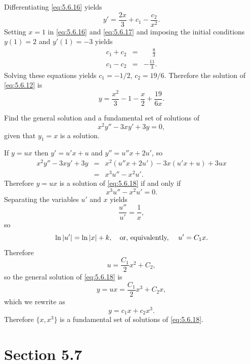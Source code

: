 \begin{examplesolution}
 Differentiating \eqref{eq:5.6.16} yields
\begin{equation}
  \label{eq:5.6.17}y'=\frac{2x}{3}+c_{1}-\frac{c_{2}}{x^{2}}.
\end{equation}
Setting $x=1$ in \eqref{eq:5.6.16} and \eqref{eq:5.6.17} and imposing the initial conditions
$y(1)=2$ and $y'(1)=-3$ yields
\begin{eqnarray*}
  c_{1}+c_{2} & = & \phantom{-}{\frac{8}{3}} \\
  c_{1}-c_{2} & = & -\frac{11}{3}.
\end{eqnarray*}
Solving these equations yields $c_{1}=-1/2$, $c_{2}=19/6$. Therefore the solution of
\eqref{eq:5.6.12} is
\[
  y=\frac{x^{2}}{3}-1-\frac{x}{2}+\frac{19}{6x}.
\]
\end{examplesolution}

\setcounter{example}{2}
\setcounter{equation}{17}
\begin{example}
  \label{example:5.6.3} \rm Find the general solution and a fundamental set of solutions of
  \begin{equation}
    \label{eq:5.6.18}x^{2}y''-3xy'+3y=0,
  \end{equation}
  given that $y_{1}=x$ is a solution.
\end{example}
\begin{examplesolution}
\solution If $y=ux$ then $y'=u'x+u$ and $y''=u''x+2u'$, so
\begin{eqnarray*}
  x^{2}y''-3xy'+3y & = & x^{2}(u''x+2u')-3x(u'x+u)+3ux \\
                   & = & x^{3}u''-x^{2}u'.
\end{eqnarray*}
Therefore $y=ux$ is a solution of \eqref{eq:5.6.18} if and only if
\[
  x^{3}u''-x^{2}u'=0.
\]
Separating the variables $u'$ and $x$ yields
\[
  \frac{u''}{u'}=\frac{1}{x},
\]
so
\[
  \ln|u'|=\ln|x|+k,\mbox{\quad or, equivalently, \quad}u'=C_{1}x.
\]
Therefore
\[
  u=\frac{C_{1}}{2}x^{2}+C_{2},
\]
so the general solution of \eqref{eq:5.6.18} is
\[
  y=ux=\frac{C_{1}}{2}x^{3}+C_{2}x,
\]
which we rewrite as
\[
  y=c_{1}x+c_{2}x^{3}.
\]
Therefore $\{x,x^{3}\}$ is a fundamental set of solutions of \eqref{eq:5.6.18}.
\end{examplesolution}

\section*{Section 5.7}
\setcounter{chapter}{5}
\setcounter{section}{7}

